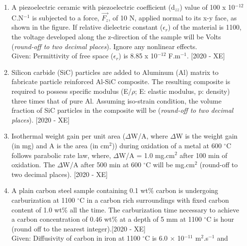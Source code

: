 \documentclass[journal]{IEEEtran}
\begin{document}
\begin{enumerate}
    \item A piezoelectric ceramic with piezoelectric coefficient (d$_{zz}$) value of 100 x 10$^{-12}$ C.N$^{-1}$ is subjected to a force, $\vec{F_z}$, of 10 N, applied normal to its x-y face, as shown in the figure. If relative dielectric constant ($\epsilon_r$) of the material is 1100, the voltage developed along the z-direction of the sample will be Volts \underline{\hspace{3cm}}(\textit{round-off to two decimal places}). Ignore any nonlinear effects.\\
    Given: Permittivity of free space ($\epsilon_r$) is 8.85 x 10$^{-12}$ F.m$^{-1}$. \hfill{[2020 - XE]}
    

    \item Silicon carbide (SiC) particles are added to Aluminum (Al) matrix to fabricate particle reinforced Al-SiC composite. The resulting composite is required to possess specific modulus (E/$\rho$; E: elastic modulus, p: density) three times that of pure Al. Assuming iso-strain condition, the volume fraction of SiC particles in the composite will be (\textit{round-off to two decimal places}). \hfill{[2020 - XE]}
    \begin{table}[h]
        \centering
        
    \end{table}
    \item Isothermal weight gain per unit area ($\Delta$W/A, where $\Delta$W is the weight gain (in mg) and A is the area (in cm$^2$)) during oxidation of a metal at 600 $^\circ$C follows parabolic rate law, where, $\Delta$W/A = 1.0 mg.cm$^2$ after 100 min of oxidation. The $\Delta$W/A after 500 min at 600 $^\circ$C will be mg.cm$^2$ (round-off to two decimal places). \hfill{[2020 - XE]}
    \item A plain carbon steel sample containing 0.1 wt\% carbon is undergoing carburization at 1100 $^\circ$C in a carbon rich surroundings with fixed carbon content of 1.0 wt\% all the time. The carburization time necessary to achieve a carbon concentration of 0.46 wt\% at a depth of 5 mm at 1100 $^\circ$C is \underline{\hspace{3cm}}hour (round off to the nearest integer).\hfill{[2020 - XE]} \\
    Given: Diffusivity of carbon in iron at 1100 $^\circ$C is 6.0 $\times$ 10$^{-11}$ m$^2$.s$^{-1}$ and 
    \begin{table}[h]
        \centering
        
    \end{table}
\end{enumerate}
\end{document}
